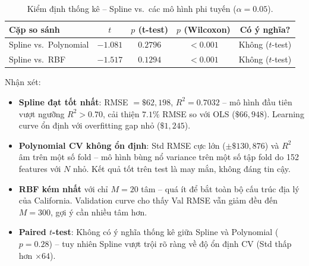 \documentclass[12pt,a4paper]{article}
\begin{document}
\begin{table}[H]
  \centering
  \caption{10-Fold CV (mean $\pm$ std) -- các mô hình phi tuyến.}
  \label{tab:nonlinear_cv}
\end{table}

\begin{table}[H]
  \centering
  \caption{Kiểm định thống kê -- Spline vs.\ các mô hình phi tuyến ($\alpha=0.05$).}
  \label{tab:nonlinear_stat}
  \begin{tabular}{lcccc}
    \toprule
    \textbf{Cặp so sánh} & $t$ & $p$ (t-test) & $p$ (Wilcoxon)
      & \textbf{Có ý nghĩa?} \\
    \midrule
    Spline vs.\ Polynomial
      & $-1.081$ & $0.2796$ & $< 0.001$ & Không ($t$-test) \\
    Spline vs.\ RBF
      & $-1.517$ & $0.1294$ & $< 0.001$ & Không ($t$-test) \\
    \bottomrule
  \end{tabular}
\end{table}

Nhận xét:
\begin{itemize}
  \item \textbf{Spline đạt tốt nhất}: RMSE $= \$62{,}198$,
        $R^2 = 0.7032$ -- mô hình đầu tiên vượt ngưỡng $R^2 > 0.70$,
        cải thiện $\mathbf{7.1\%}$ RMSE so với OLS ($\$66{,}948$).
        Learning curve ổn định với overfitting gap nhỏ ($\$1{,}245$).
  \item \textbf{Polynomial CV không ổn định}: Std RMSE cực lớn
        ($\pm\$130{,}876$) và $R^2$ âm trên một số fold -- mô hình
        bùng nổ variance trên một số tập fold do 152 features với
        $N$ nhỏ. Kết quả tốt trên test là may mắn, không đáng tin cậy.
  \item \textbf{RBF kém nhất} với chỉ $M = 20$ tâm -- quá ít để bắt
        toàn bộ cấu trúc địa lý của California. Validation curve cho
        thấy Val RMSE vẫn giảm đều đến $M = 300$, gợi ý cần nhiều
        tâm hơn.
  \item \textbf{Paired $t$-test}: Không có ý nghĩa thống kê giữa
        Spline và Polynomial ($p = 0.28$) -- tuy nhiên Spline vượt
        trội rõ ràng về độ ổn định CV (Std thấp hơn $\times 64$).
\end{itemize}
\end{document}
